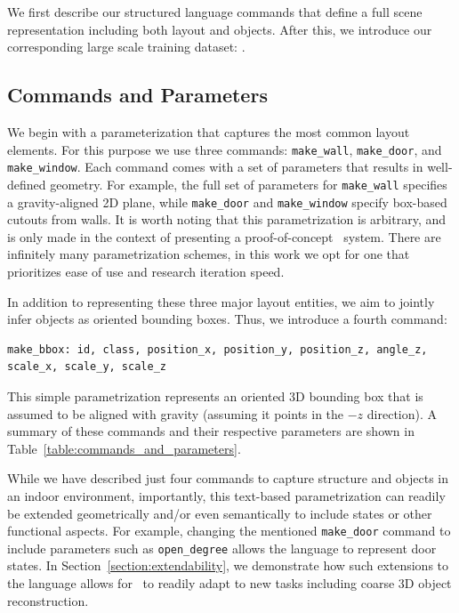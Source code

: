 We first describe our structured language commands
that define a full scene representation including both layout and objects.
After this, we introduce our corresponding
large scale training dataset: \DatasetName{}.

\subsection{Commands and Parameters}
\label{subsec:ssl_commands}

We begin with a parameterization that captures the most common layout elements.
For this purpose we use three commands:
\texttt{make\_wall}, \texttt{make\_door}, and \texttt{make\_window}.
Each command comes with a set of parameters that results in well-defined geometry.
For example,
the full set of parameters for \texttt{make\_wall} specifies a gravity-aligned 2D plane,
while \texttt{make\_door} and \texttt{make\_window} specify box-based cutouts from walls.
It is worth noting that this parametrization is arbitrary,
and is only made in the context of presenting a proof-of-concept \METHOD~system.
There are infinitely many parametrization schemes,
in this work we opt for one that prioritizes ease of use and research iteration speed.

In addition to representing these three major layout entities, we aim to jointly infer objects as oriented bounding boxes. Thus, we introduce a fourth command:
\begin{lstlisting}[language=StructuredLanguage]
make_bbox: id, class, position_x, position_y, position_z, angle_z, scale_x, scale_y, scale_z
\end{lstlisting}
This simple parametrization represents an oriented 3D bounding box that is assumed to be aligned with gravity (assuming it points in the $-z$ direction). 
A summary of these commands and their respective parameters are shown in Table~\ref{table:commands_and_parameters}.

While we have described just four commands to capture structure and objects in an indoor environment, importantly,
this text-based parametrization can readily be extended 
geometrically and/or even semantically
to include states or other functional aspects.
For example,
changing the mentioned \texttt{make\_door} command
to include parameters 
such as \texttt{open\_degree}
allows the language to represent door states.
In Section~\ref{section:extendability},
we demonstrate how such extensions to the language allows for \METHOD~to readily adapt to new tasks including coarse 3D object reconstruction.

